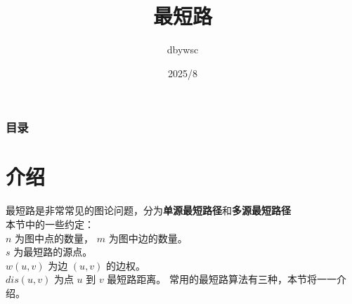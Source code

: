 \documentclass{beamer}
\title{最短路}
\author{dbywsc}
\date{2025/8}
\newcommand{\fdf}[1]{\alert{\textbf{#1}}}
\begin{document}
\frame{\titlepage}
\begin{frame}
	\frametitle{目录}
	\tableofcontents
\end{frame}
\section{介绍}
\begin{frame}
最短路是非常常见的图论问题，分为\fdf{单源最短路径}和\fdf{多源最短路径}\\ 
本节中的一些约定：\\ 
$n$ 为图中点的数量， $m$ 为图中边的数量。\\ 
$s$ 为最短路的源点。 \\ 
$w(u, v)$ 为边 $(u, v)$ 的边权。\\ 
$dis(u, v)$ 为点 $u$ 到 $v$ 最短路距离。
常用的最短路算法有三种，本节将一一介绍。
\end{frame}
\end{document}
